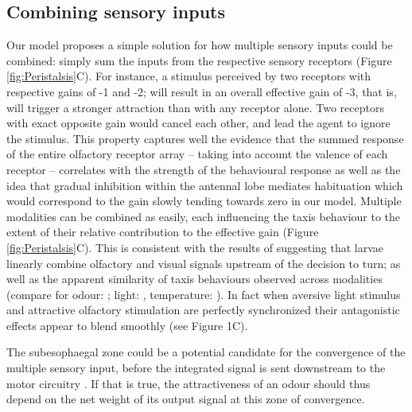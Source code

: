 \documentclass[11pt,a4paper]{article}
\newcommand{\todoML}[1]{\todo[author=ML,color=white, size=\tiny,inline]{#1}}
\begin{document}
\subsection{Combining sensory inputs}
Our model proposes a simple solution for how multiple sensory inputs could be combined: simply sum the inputs from the respective sensory receptors (Figure \ref{fig:Peristalsis}C). For instance, a stimulus perceived by two receptors with respective gains of -1 and -2; will result in an overall effective gain of -3, that is, will trigger a stronger attraction than with any receptor alone. Two receptors with exact opposite gain would cancel each other, and lead the agent to ignore the stimulus. This property captures well the evidence that the summed response of the entire olfactory receptor array – taking into account the valence of each receptor – correlates with the strength of the behavioural response \citep{kreher2008translation} as well as the idea that gradual inhibition within the antennal lobe mediates habituation \citep{das2011plasticity} which would correspond to the gain slowly tending towards zero in our model. 
Multiple modalities can be combined as easily, each influencing the taxis behaviour to the extent of their relative contribution to the effective gain (Figure \ref{fig:Peristalsis}C). This is consistent with the results of \cite{gepner2015computations} suggesting that larvae linearly combine olfactory and visual signals upstream of the decision to turn; as well as the apparent similarity of taxis behaviours observed across modalities (compare for odour: \cite{gomez2011active}; light: \cite{kane2013sensorimotor},   temperature: \cite{lahiri2011two}). In fact when aversive light stimulus and attractive olfactory stimulation are perfectly synchronized their antagonistic effects appear to blend smoothly (see \cite{bellmann2010optogenetically} Figure 1C). 

The subesophaegal zone could be a potential candidate for the convergence of the multiple sensory input, before the integrated signal is sent downstream to the motor circuitry \citep{tastekin2015role}. If that is true, the attractiveness of an odour should thus depend on the net weight of its output signal at this zone of convergence.  
\end{document}
